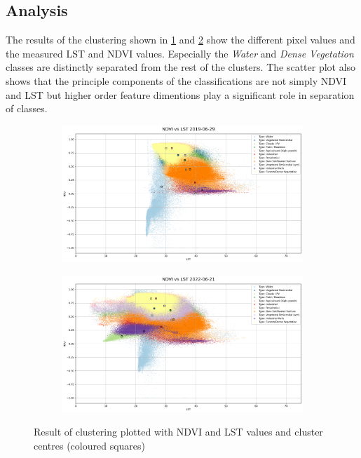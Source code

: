 \documentclass[12pt,a4paper, english,twoside]{scrartcl}
\begin{document}
    \subsection{Analysis}\label{sec:landcoverAnalysis} 
      The results of the clustering shown in \cref{fig:ndvilst01} and \cref{fig:ndvilst02} show the different pixel values and the measured LST and NDVI values. 
      Especially the \textit{Water} and \textit{Dense Vegetation} classes are distinctly separated from the rest of the clusters. 
      The scatter plot also shows that the principle components of the classifications are not simply NDVI and LST but higher order feature dimentions play a significant role in separation of classes. 
      \begin{figure}[!htbp]
      \begin{subfigure}[b]{\textwidth}
        \centering
        \includegraphics[width=\textwidth]{img/NDVI vs LST 2019-06-29.png}
        \label{fig:ndvilst01}
      \end{subfigure}
      \begin{subfigure}[b]{\textwidth}
        \centering
        \includegraphics[width=\textwidth]{img/NDVI vs LST 2022-06-21.png}
        \label{fig:ndvilst02}
      \end{subfigure}
      \caption{Result of clustering plotted with \gls{NDVI} and \gls{LST} values and cluster centres (coloured squares)\label{fig:kmeansclusters}}
      \end{figure}
\end{document}
